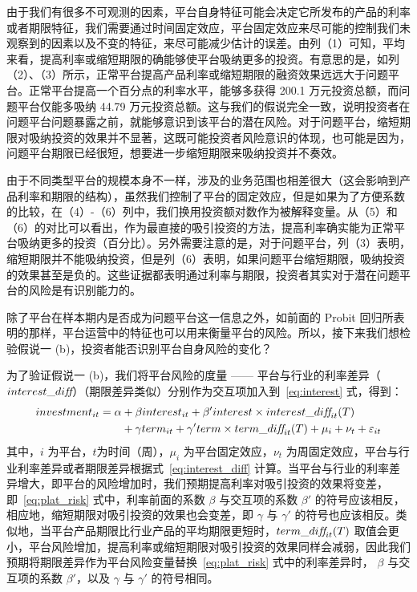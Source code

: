 \documentclass[lang=cn,11pt]{elegantpaper}
\begin{document}
由于我们有很多不可观测的因素，平台自身特征可能会决定它所发布的产品的利率或者期限特征，我们需要通过时间固定效应，平台固定效应来尽可能的控制我们未观察到的因素以及不变的特征，来尽可能减少估计的误差。由列（1）可知，平均来看，提高利率或缩短期限的确能够使平台吸纳更多的投资。有意思的是，如列（2）、（3）所示，正常平台提高产品利率或缩短期限的融资效果远远大于问题平台。正常平台提高一个百分点的利率水平，能够多获得 200.1 万元投资总额，而问题平台仅能多吸纳 44.79 万元投资总额。这与我们的假说完全一致，说明投资者在问题平台问题暴露之前，就能够意识到该平台的潜在风险。对于问题平台，缩短期限对吸纳投资的效果并不显著，这既可能投资者风险意识的体现，也可能是因为，问题平台期限已经很短，想要进一步缩短期限来吸纳投资并不奏效。

由于不同类型平台的规模本身不一样，涉及的业务范围也相差很大（这会影响到产品利率和期限的结构），虽然我们控制了平台的固定效应，但是如果为了方便系数的比较，在（4）-（6）列中，我们换用投资额对数作为被解释变量。从（5）和（6）的对比可以看出，作为最直接的吸引投资的方法，提高利率确实能为正常平台吸纳更多的投资（百分比）。另外需要注意的是，对于问题平台，列（3）表明，缩短期限并不能吸纳投资，但是列（6）表明，如果问题平台缩短期限，吸纳投资的效果甚至是负的。这些证据都表明通过利率与期限，投资者其实对于潜在问题平台的风险是有识别能力的。

除了平台在样本期内是否成为问题平台这一信息之外，如前面的 Probit 回归所表明的那样，平台运营中的特征也可以用来衡量平台的风险。所以，接下来我们想检验假说一 (b)，投资者能否识别平台自身风险的变化？

为了验证假说一 (b)，我们将平台风险的度量 —— 平台与行业的利率差异（$interest\_di\emph{f\kern0pt f}$）（期限差异类似）分别作为交互项加入到~\eqref{eq:interest} 式，得到：
\begin{equation}\label{eq:plat_risk}
      \begin{split}
            investment_{it} = \alpha &+ \beta interest_{it} + \beta' interest \times interest\_di\emph{f\kern0pt f}_{it}(T) \\
            &+ \gamma term_{it}  + \gamma' term \times term\_di\emph{f\kern0pt f}_{it}(T) + \mu_i + \nu_t + \varepsilon_{it}
      \end{split}
\end{equation}
其中，$i$ 为平台，$t$为时间（周），$\mu_i$ 为平台固定效应，$\nu_t$ 为周固定效应，平台与行业利率差异或者期限差异根据式~\eqref{eq:interest_diff} 计算。当平台与行业的利率差异增大，即平台的风险增加时，我们预期提高利率对吸引投资的效果将变差，即~\eqref{eq:plat_risk} 式中，利率前面的系数 $\beta$ 与交互项的系数 $\beta'$ 的符号应该相反，相应地，缩短期限对吸引投资的效果也会变差，即 $\gamma$ 与 $\gamma'$ 的符号也应该相反。类似地，当平台产品期限比行业产品的平均期限更短时，$term\_di\emph{f\kern0pt f}_{it}(T)$ 取值会更小，平台风险增加，提高利率或缩短期限对吸引投资的效果同样会减弱，因此我们预期将期限差异作为平台风险变量替换~\eqref{eq:plat_risk} 式中的利率差异时， $\beta$ 与交互项的系数 $\beta'$，以及 $\gamma$ 与 $\gamma'$ 的符号相同。
\end{document}
